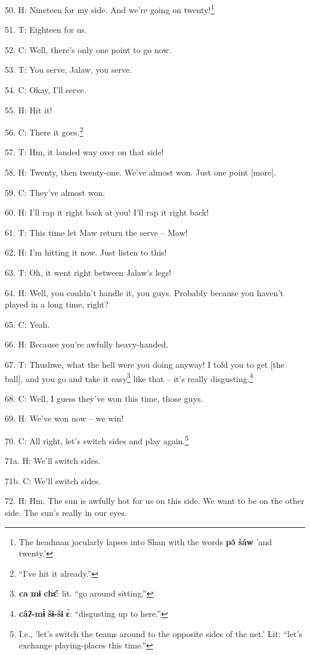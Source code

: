 50. H: Nineteen for my side. And we're going on twenty!\footnote{The headman jocularly lapses into Shan with the words \textbf{pə̂} \textbf{šáw} 'and twenty.'}

51. T: Eighteen for us.

52. C: Well, there's only one point to go now.

53. T: You serve, Jalaw, you serve.

54. C: Okay, I'll serve.

55. H: Hit it!

56. C: There it goes.\footnote{``I've hit it already.''}

57. T: Hm, it landed way over on that side!

58. H: Twenty, then twenty-one. We've almost won. Just one point [more].

59. C: They've almost won.

60. H: I'll rap it right back at you! I'll rap it right back!

61. T: This time let Maw return the serve -- Maw!

62. H: I'm hitting it now. Just listen to this!


63. T: Oh, it went right between Jalaw's legs!

64. H: Well, you couldn't handle it, you guys. Probably because you haven't played
in a long time, right?

65. C: Yeah.

66. H: Because you're awfully heavy-handed.

67. T: Thushwe, what the hell were you doing anyway! I told you to get [the ball],
and you go and take it easy\footnote{\textbf{ca} \textbf{mɨ} \textbf{chɛ̂}: lit. ``go around sitting.''} like that -- it's really disgusting.\footnote{\textbf{câʔ-mɨ̀} \textbf{šɨ-šɨ} \textbf{ɛ̀}: ``disgusting up to here.''}

68. C: Well, I guess they've won this time, those guys.

69. H: We've won now -- we win!

70. C: All right, let's switch sides and play again.\footnote{I.e., 'let's switch the teams around to the opposite sides of the net.' Lit: ``let's exchange playing-places this time.''}

71a. H: We'll switch sides.

71b. C: We'll switch sides.

72. H: Hm. The sun is awfully hot for us on this side. We want to be on the other
side. The sun's really in our eyes.

